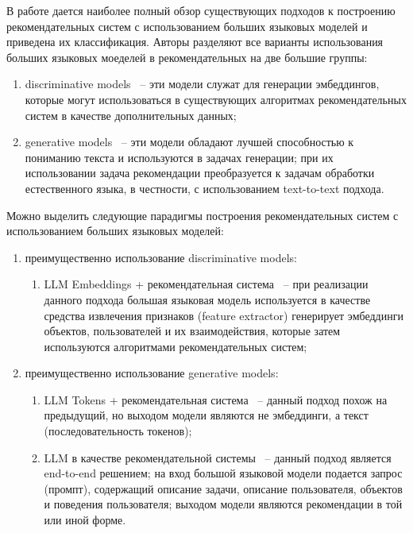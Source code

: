 В работе \cite{llm_rs_survey} дается наиболее полный обзор существующих подходов к построению рекомендательных систем с использованием больших языковых моделей и приведена их классификация. Авторы разделяют все варианты использования больших языковых моеделей в рекомендательных на две большие группы:
\begin{enumerate}
    \item discriminative models ~-- эти модели служат для генерации эмбеддингов, которые могут использоваться в существующих алгоритмах рекомендательных систем в качестве дополнительных данных;
    \item generative models ~-- эти модели обладают лучшей способностью к пониманию текста и используются в задачах генерации; при их использовании задача рекомендации преобразуется к задачам обработки естественного языка, в честности, с использованием text-to-text подхода.
\end{enumerate}

Можно выделить следующие парадигмы построения рекомендательных систем с использованием больших языковых моделей:
\begin{enumerate}
    \item преимущественно использование discriminative models:
    \begin{enumerate}
        \item LLM Embeddings + рекомендательная система ~-- при реализации данного подхода большая языковая модель используется в качестве средства извлечения признаков (feature extractor) генерирует эмбеддинги объектов, пользователей и их взаимодействия, которые затем используются алгоритмами рекомендательных систем;
    \end{enumerate}
    \item преимущественно использование generative models:
    \begin{enumerate}
        \item LLM Tokens + рекомендательная система ~-- данный подход похож на предыдущий, но выходом модели являются не эмбеддинги, а текст (последовательность токенов);
        \item LLM в качестве рекомендательной системы ~-- данный подход является end-to-end решением; на вход большой языковой модели подается запрос (промпт), содержащий описание задачи, описание пользователя, объектов и поведения пользователя; выходом модели являются рекомендации в той или иной форме.
    \end{enumerate}
\end{enumerate}

